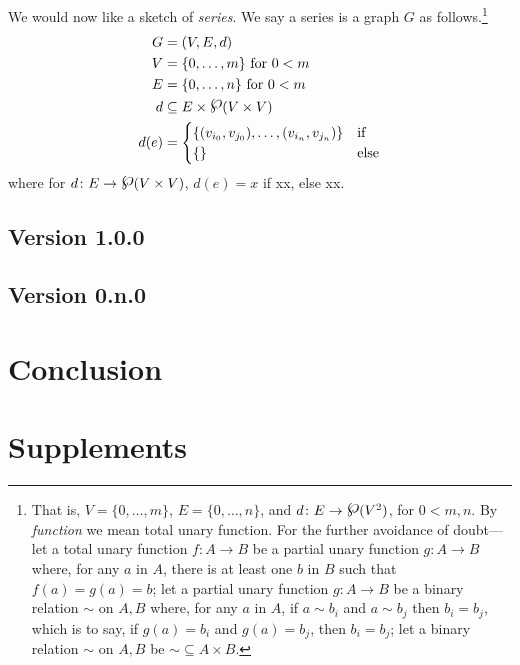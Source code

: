 \documentclass{amsart}%
\newcommand{\mention}[1]{\textit{#1}}%
\newcommand{\simset}{\mathord\sim}%
\newcommand{\powerset}{\raisebox{.15\baselineskip}{\Large\ensuremath{\wp}}}%
\theoremstyle{plain}
\theoremstyle{definition}
\theoremstyle{remark}
\theoremstyle{definition}
\theoremstyle{remark}
\begin{document}
We would now like a sketch of \mention{series}. We say a series is a graph \(G\) as follows.\footnote{That is, \(V=\{0,\ldots,m\}\), \(E=\{0,\ldots,n\}\), and \(d\colon E\to\powerset(V^2)\), for \(0<m,n\). By \mention{function} we mean total unary function. For the further avoidance of doubt---let a total unary function \(f\colon A\to B\) be a partial unary function \(g\colon A\to B\) where, for any \(a\) in \(A\), there is at least one \(b\) in \(B\) such that \(f(a)=g(a)=b\); let a partial unary function \(g\colon A\to B\) be a binary relation \(\sim\) on \(A,B\) where, for any \(a\) in \(A\), if \(a\sim b_i\) and \(a\sim b_j\) then \(b_i=b_j\), which is to say, if \(g(a)=b_i\) and \(g(a)=b_j\), then \(b_i=b_j\); let a binary relation \(\sim\) on \(A,B\) be \(\simset\subseteq A\times B\).}
\begin{align*}
G &= (V, E, d)\\%
V &= \{0,\ldots,m\}\text{ for } 0<m\\
E &= \{0,\ldots,n\}\text{ for } 0<m\\
d &\subseteq E\times\powerset(V\times V)\\
d(e) &=\begin{cases}
\{(v_{i_0},v_{j_0}),\ldots,(v_{i_n},v_{j_n})\} & \text{if}\\
\{\} & \text{else}
\end{cases}
\end{align*}
where for \(d\colon E\to\powerset(V\times V)\), \(d(e)=x\) if xx, else xx.
%
%
%
\subsection{Version 1.0.0}
\label{ss:ver1}
\lipsum[1-3]
%
%
%
\subsection{Version 0.n.0}
\label{ss:ver0}
\lipsum[1-3]
%
%
%
%
%
\section{Conclusion}
\label{s:conc}
\lipsum[1]
%
%
%
%
%
\section*{Supplements}
\label{s:supp}
\lipsum[1][1-3]
\end{document}
